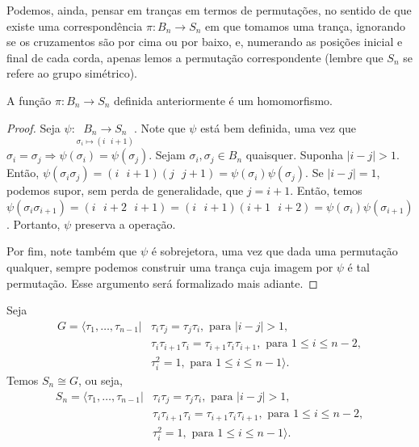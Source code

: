	\par\vspace{0.3cm} Podemos, ainda, pensar em tranças em termos de permutações, no sentido de que existe 
	uma correspondência $\pi: B_n\to S_n$ em que tomamos uma trança, ignorando se os cruzamentos são por cima ou por baixo, 
	e, numerando as posições inicial e final de cada corda, apenas lemos a permutação correspondente 
	(lembre que $S_n$ se refere ao grupo simétrico).
	\begin{lemma}
	\label{B_n iso S_n}
		A função $\pi: B_n\to S_n$ definida anteriormente é um homomorfismo.
	\end{lemma}
	\begin{proof}
		Seja $\psi:\underset{\sigma_i\mapsto(i\text{ }i+1)}{B_n\to S_n}$. Note que $\psi$ está bem definida, 
		uma vez que $\sigma_i=\sigma_j\Rightarrow\psi(\sigma_i)=\psi(\sigma_j)$. Sejam 
		$\sigma_i,\sigma_j\in B_n$ quaisquer. Suponha $|i-j|>1$. Então, 
		$\psi(\sigma_i\sigma_j)=(i\text{ } i+1)(j\text{ } j+1)=\psi(\sigma_i)\psi(\sigma_j)$. Se 
		$|i-j|=1$, podemos supor, sem perda de generalidade, que $j=i+1$. Então, temos
		$\psi(\sigma_i\sigma_{i+1})=(i\text{ } i+2\text{ } i+1)=(i\text{ } i+1)(i+1\text{ }
		i+2)=\psi(\sigma_i)\psi(\sigma_{i+1})$. Portanto, $\psi$ preserva a operação. 
		
		\par\vspace{0.3cm} Por fim, note também que $\psi$ é sobrejetora, uma vez que dada uma permutação 
		qualquer, sempre podemos construir uma trança cuja imagem por $\psi$ é tal permutação. Esse argumento 
		será formalizado mais adiante.
	\end{proof}
	\begin{lemma}
	\label{apresentacao de S_n}
		Seja
		\begin{align*} 
		G = 
		\langle \tau_1,\dots,\tau_{n-1} | &\tau_i\tau_j = \tau_j\tau_i, \text{ para }|i - j|>1,\\
		&\tau_i\tau_{i+1}\tau_i = \tau_{i+1}\tau_i\tau_{i+1}, \text{ para } 1\leq i\leq n-2, \\ 
		&\tau_i^2 = 1, \text{ para }1\leq i\leq n-1\rangle. 
		\end{align*}
		Temos $S_n\cong G$, ou seja, 
		\begin{align*} 
		S_n 
		= \langle \tau_1,\dots,\tau_{n-1} | &\tau_i\tau_j = \tau_j\tau_i, \text{ para }|i - j|>1,\\
		&\tau_i\tau_{i+1}\tau_i = \tau_{i+1}\tau_i\tau_{i+1}, \text{ para } 1\leq i\leq n-2, \\ 
		&\tau_i^2 = 1, \text{ para }1\leq i\leq n-1\rangle. 
		\end{align*}
	\end{lemma}
